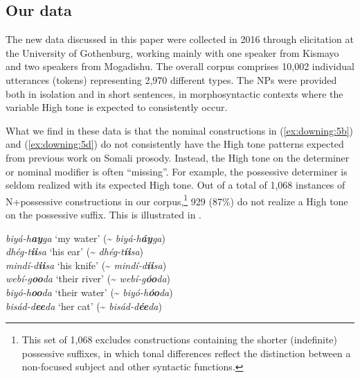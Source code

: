 \documentclass[output=paper]{langscibook}
\begin{document}
\subsection{Our data}

The new data discussed in this paper were collected in 2016 through elicitation at the University of Gothenburg, working mainly with one speaker from Kismayo and two speakers from Mogadishu. The overall corpus comprises 10,002 individual utterances (tokens) representing 2,970 different types. The NPs were provided both in isolation and in short sentences, in morphosyntactic contexts where the variable High tone is expected to consistently occur.

What we find in these data is that the nominal constructions in (\ref{ex:downing:5b}) and (\ref{ex:downing:5d}) do not consistently have the High tone patterns expected from previous work on Somali prosody. Instead, the High tone on the determiner or nominal modifier is often ``missing''. For example, the possessive determiner is seldom realized with its expected High tone. Out of a total of 1,068 instances of N+possessive constructions in our corpus,\footnote{This set of 1,068 excludes constructions containing the shorter (indefinite) possessive suffixes, in which tonal differences reflect the distinction between a non-focused subject and other syntactic functions.} 929 (87\%) do not realize a High tone on the possessive suffix. This is illustrated in . 


\ea\label{ex:downing:6}
\ea  \textit{biyá-h}\textbf{\textit{ay}}\textit{ga}   ‘my water’  ({\textasciitilde} \textit{biyá-h}\textbf{\textit{áy}}\textit{ga}) \label{ex:downing:6a}\\
\ex   \textit{dhég-t}\textbf{\textit{ii}}\textit{sa}   ‘his ear’  ({\textasciitilde} \textit{dhég-t}\textbf{\textit{íi}}\textit{sa})\label{ex:downing:6b}\\
\ex   \textit{mindí-d}\textbf{\textit{ii}}\textit{sa}   ‘his knife’  ({\textasciitilde} \textit{mindí-d}\textbf{\textit{íi}}\textit{sa})\label{ex:downing:6c}\\
\ex   \textit{webí-g}\textbf{\textit{oo}}\textit{da}  ‘their river’  ({\textasciitilde} \textit{webí-g}\textbf{\textit{óo}}\textit{da})\label{ex:downing:6d}\\
\ex   \textit{biyó-h}\textbf{\textit{oo}}\textit{da}   ‘their water’  ({\textasciitilde} \textit{biyó-h}\textbf{\textit{óo}}\textit{da})\label{ex:downing:6e}\\
\ex   \textit{bisád-d}\textbf{\textit{ee}}\textit{da}   ‘her cat’  ({\textasciitilde} \textit{bisád-d}\textbf{\textit{ée}}\textit{da})\label{ex:downing:6f}\\
\z
\z
\end{document}
